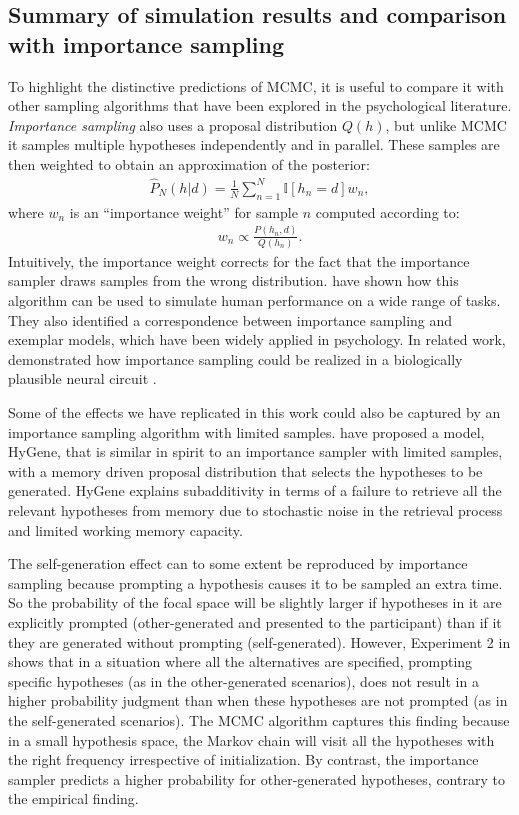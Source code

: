 \subsection{Summary of simulation results and comparison with importance sampling}

To highlight the distinctive predictions of MCMC, it is useful to compare it with other sampling algorithms that have been explored in the psychological literature. \emph{Importance sampling} also uses a proposal distribution $Q(h)$, but unlike MCMC it samples multiple hypotheses independently and in parallel. These samples are then weighted to obtain an approximation of the posterior:
\begin{align}
\hat{P}_N(h|d) = \frac{1}{N} \sum_{n=1}^N \mathbb{I}[h_n=d] w_n,
\end{align}
where $w_n$ is an ``importance weight'' for sample $n$ computed according to:
\begin{align}
w_n \propto \frac{P(h_n,d)}{Q(h_n)}.
\end{align}
Intuitively, the importance weight corrects for the fact that the importance sampler draws samples from the wrong distribution. \citet{shi10} have shown how this algorithm can be used to simulate human performance on a wide range of tasks. They also identified a correspondence between importance sampling and exemplar models, which have been widely applied in psychology. In related work, \citet{shi2009neural} demonstrated how importance sampling could be realized in a biologically plausible neural circuit \citep[see also][]{abbott13}.

Some of the effects we have replicated in this work could also be captured by an importance sampling algorithm with limited samples. \citet{Thomas2008} have proposed a model, HyGene, that is similar in spirit to an importance sampler with limited samples, with a memory driven proposal distribution that selects the hypotheses to be generated. HyGene explains subadditivity in terms of a failure to retrieve all the relevant hypotheses from memory due to stochastic noise in the retrieval process and limited working memory capacity.

The self-generation effect can to some extent be reproduced by importance sampling because prompting a hypothesis causes it to be sampled an extra time. So the probability of the focal space will be slightly larger if hypotheses in it are explicitly prompted (other-generated and presented to the participant) than if it they are generated without prompting (self-generated). However, Experiment 2 in \citet{conf} shows that in a situation where all the alternatives are specified, prompting specific hypotheses (as in the other-generated scenarios), does not result in a higher probability judgment than when these hypotheses are not prompted (as in the self-generated scenarios). The MCMC algorithm captures this finding because in a small hypothesis space, the Markov chain will visit all the hypotheses with the right frequency irrespective of initialization. By contrast, the importance sampler predicts a higher probability for other-generated hypotheses, contrary to the empirical finding.

